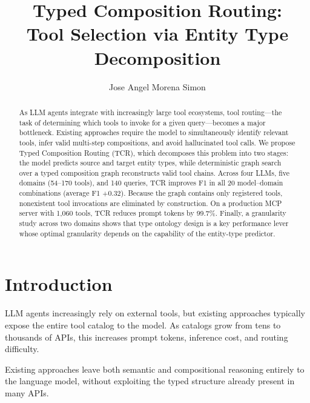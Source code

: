 \documentclass{article}
\title{Typed Composition Routing:\\Tool Selection via Entity Type Decomposition}
\author{
  Jose Angel Morena Simon
}
\begin{document}
\maketitle


\begin{abstract}
As LLM agents integrate with increasingly large tool ecosystems, tool routing---the task of determining which tools to invoke for a given query---becomes a major bottleneck. Existing approaches require the model to simultaneously identify relevant tools, infer valid multi-step compositions, and avoid hallucinated tool calls. We propose Typed Composition Routing (TCR), which decomposes this problem into two stages: the model predicts source and target entity types, while deterministic graph search over a typed composition graph reconstructs valid tool chains. Across four LLMs, five domains (54--170 tools), and 140 queries, TCR improves F1 in all 20 model--domain combinations (average F1 $+0.32$). Because the graph contains only registered tools, nonexistent tool invocations are eliminated by construction. On a production MCP server with 1,060 tools, TCR reduces prompt tokens by 99.7\%. Finally, a granularity study across two domains shows that type ontology design is a key performance lever whose optimal granularity depends on the capability of the entity-type predictor.
\end{abstract}


\section{Introduction}

LLM agents increasingly rely on external tools, but existing approaches typically expose the entire tool catalog to the model. As catalogs grow from tens to thousands of APIs, this increases prompt tokens, inference cost, and routing difficulty.

Existing approaches leave both semantic and compositional reasoning entirely to the language model, without exploiting the typed structure already present in many APIs.
\end{document}
